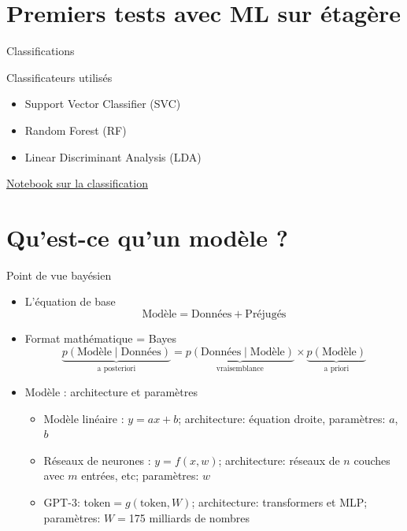 \documentclass[presentation, aspectratio=169]{beamer}
\begin{document}
\section{Premiers tests avec ML sur étagère}

\begin{frame}{Classifications}
  \begin{block}{Classificateurs utilisés}
    \begin{itemize}
    \item Support Vector Classifier (SVC)
    \item Random Forest (RF)
    \item Linear Discriminant Analysis (LDA)
    \end{itemize}
  \end{block}

  \href{https://github.com/alban-goupil/jc-fare-2025/blob/main/notebooks/2-classifieurs.ipynb}{Notebook
    sur la classification}
\end{frame}


\section{Qu'est-ce qu'un modèle ?}

\begin{frame}{Point de vue bayésien}
  \begin{itemize}
  \item L'équation de base
    \begin{equation*}
      \text{Modèle} = \text{Données} + \text{Préjugés}
    \end{equation*}
  \item Format mathématique = Bayes
    \begin{equation*}
      \underbrace{p(\text{Modèle}\mid \text{Données})}_{\text{a posteriori}}
        = \underbrace{p(\text{Données}\mid\text{Modèle})}_{\text{vraisemblance}}
        \times
        \underbrace{p(\text{Modèle})}_{\text{a priori}}
    \end{equation*}
  \item Modèle : architecture et paramètres
    \begin{itemize}
    \item Modèle linéaire : $y = ax+b$; architecture:
      équation droite, paramètres: $a$, $b$
    \item Réseaux de neurones : $y = f(x, w)$; architecture: réseaux
      de $n$ couches avec $m$ entrées, etc; paramètres: $w$
    \item GPT-3: $\text{token} = g(\text{token}, W)$; architecture:
      transformers et MLP; paramètres: $W = $175 milliards de nombres
    \end{itemize}
  \end{itemize}
\end{frame}
\end{document}
